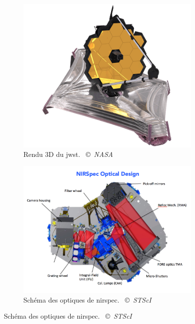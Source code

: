 \documentclass[11pt, a4paper]{article}
\newcommand{\customcite}[2]{\mbox{
  {\small \copyright} \textit{#1} \cite{#2}}
}
\begin{document}
\begin{figure}
  \centering
     \begin{subfigure}[b]{0.45\textwidth}
         \centering
         \includegraphics[width=\textwidth]{assets/JWST_spacecraft_model_3.png}
         \caption{Rendu 3D du \gls{jwst}. \customcite{NASA}{jwst_nasa}}
         \label{fig:jwst}
     \end{subfigure}
     \hfill
     \begin{subfigure}[b]{0.45\textwidth}
         \centering
         \includegraphics[width=\textwidth]{assets/NIRSpec_Optical_design.png}
         \caption{Schéma des optiques de \gls{nirspec}. \customcite{STScI}{nirspec}}
         \label{fig:nirspec}
     \end{subfigure}
\end{figure}
\end{document}
